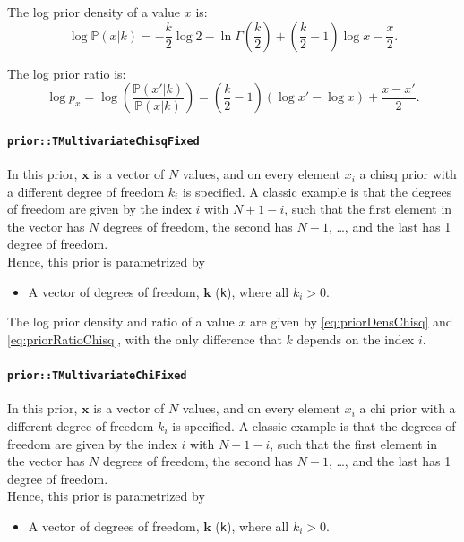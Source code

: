 \documentclass[a4paper,11pt]{article}
\def\p{\mathbb{P}}
\newcommand{\class}[1]{\texttt{#1}}
\newcommand{\privparam}[1]{\texttt{\textunderscore #1}}
\begin{document}
The log prior density of a value $x$ is:
\begin{equation}\label{eq:priorDensChisq}
 \log \p(x|k) = -\frac{k}{2} \log 2 - \ln \Gamma\left(\frac{k}{2}\right) + \left(\frac{k}{2} - 1 \right) \log x - \frac{x}{2}.
\end{equation}

The log prior ratio is:
\begin{equation}\label{eq:priorRatioChisq}
 \log p_x = \log \left( \frac{\p(x'|k)}{\p(x|k)} \right) = \left( \frac{k}{2} - 1 \right) (\log x' - \log x) + \frac{x - x'}{2}.
\end{equation}

\paragraph{\class{prior::TMultivariateChisqFixed}}
In this prior, $\boldsymbol{x}$ is a vector of $N$ values, and on every element $x_i$ a chisq prior with a different degree of freedom $k_i$ is specified. A classic example is that the degrees of freedom are given by the index $i$ with $N+1-i$, such that the first element in the vector has $N$ degrees of freedom, the second has $N-1$, \ldots, and the last has 1 degree of freedom.\\
Hence, this prior is parametrized by
\begin{itemize}
 \item A vector of degrees of freedom, $\boldsymbol k$ (\privparam{k}), where all $k_i>0$.
\end{itemize}
The log prior density and ratio of a value $x$ are given by \eqref{eq:priorDensChisq} and \eqref{eq:priorRatioChisq}, with the only difference that $k$ depends on the index $i$.

\paragraph{\class{prior::TMultivariateChiFixed}}
In this prior, $\boldsymbol{x}$ is a vector of $N$ values, and on every element $x_i$ a chi prior with a different degree of freedom $k_i$ is specified. A classic example is that the degrees of freedom are given by the index $i$ with $N+1-i$, such that the first element in the vector has $N$ degrees of freedom, the second has $N-1$, \ldots, and the last has 1 degree of freedom.\\
Hence, this prior is parametrized by
\begin{itemize}
 \item A vector of degrees of freedom, $\boldsymbol k$ (\privparam{k}), where all $k_i>0$.
\end{itemize}
\end{document}
